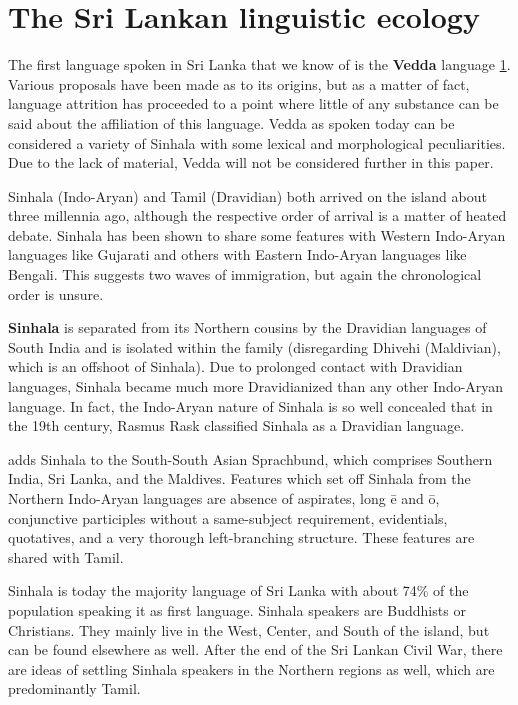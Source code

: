 \documentclass[handout,utf8]{article}
\begin{document}
\section{The Sri Lankan linguistic ecology}
The first language spoken in Sri Lanka that we know of is the \textbf{Vedda} language \ref{}. Various proposals have been made as to its origins, but as a matter of fact, language attrition has proceeded to a point where little of any substance can be said about the affiliation of this language. Vedda as spoken today can be considered a variety of Sinhala with some lexical and morphological peculiarities. Due to the lack of material, Vedda will not be considered further in this paper. 

Sinhala (Indo-Aryan) and Tamil (Dravidian) both arrived on the island about three millennia ago, although the respective order of arrival is a matter of heated debate. Sinhala has been shown to share some features with Western Indo-Aryan languages like Gujarati and others with Eastern Indo-Aryan languages like Bengali. This suggests two waves of immigration, but again the chronological order is unsure. 

\textbf{Sinhala} is separated from its Northern cousins by the Dravidian languages of South India and is isolated within the family (disregarding Dhivehi (Maldivian), which is an offshoot of Sinhala). Due to prolonged contact with Dravidian languages, Sinhala became much more Dravidianized than any other Indo-Aryan language. In fact, the Indo-Aryan nature of Sinhala is so well concealed that in the 19th century, Rasmus Rask \citep{ref} classified Sinhala as a Dravidian language. 

\citet{Gair} adds Sinhala to the South-South Asian Sprachbund, which comprises Southern India, Sri Lanka, and the Maldives. Features which set off Sinhala from the Northern Indo-Aryan languages are absence of aspirates, long \=e and \=o, conjunctive participles without a same-subject requirement, evidentials, quotatives, and a very thorough left-branching structure. These features are shared with Tamil.

Sinhala is today the majority language of Sri Lanka with about 74\% of the population speaking it as first language. Sinhala speakers are Buddhists or Christians. They mainly live in the West, Center, and South of the island, but can be found elsewhere as well. After the end of the Sri Lankan Civil War, there are ideas of settling Sinhala speakers in the Northern regions as well, which are predominantly Tamil.
\end{document}
